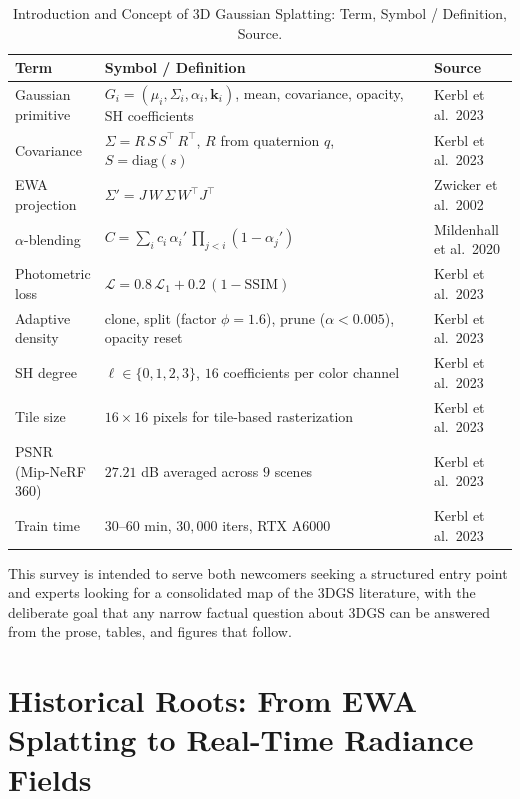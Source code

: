 \documentclass{article}
\begin{document}
\begin{table}[t]
\centering
\caption{Introduction and Concept of 3D Gaussian Splatting: Term, Symbol / Definition, Source.}
\label{tab:introduction-and-concept-of-3d-gaussian-splatting}
\begin{tabular}{>{\raggedright\arraybackslash}p{0.1473\linewidth}
  >{\raggedright\arraybackslash}p{0.6822\linewidth}
  >{\raggedright\arraybackslash}p{0.1705\linewidth}}
\toprule
\textbf{Term} & \textbf{Symbol / Definition} & \textbf{Source} \\
\midrule
Gaussian primitive & \(G_i=(\mu_i,\Sigma_i,\alpha_i,\mathbf{k}_i)\), mean, covariance, opacity, SH coefficients & Kerbl et al.~2023 \\
Covariance & \(\Sigma = R\,S\,S^{\top}\,R^{\top}\), \(R\) from quaternion \(q\), \(S=\mathrm{diag}(s)\) & Kerbl et al.~2023 \\
EWA projection & \(\Sigma' = J\,W\,\Sigma\,W^{\top}J^{\top}\) & Zwicker et al.~2002 \\
\(\alpha\)-blending & \(C=\sum_i c_i\,\alpha_i'\,\prod_{j<i}(1-\alpha_j')\) & Mildenhall et al.~2020 \\
Photometric loss & \(\mathcal{L}=0.8\,\mathcal{L}_1+0.2\,(1-\mathrm{SSIM})\) & Kerbl et al.~2023 \\
Adaptive density & clone, split (factor \(\phi=1.6\)), prune (\(\alpha<0.005\)), opacity reset & Kerbl et al.~2023 \\
SH degree & \(\ell\in\{0,1,2,3\}\), \(16\) coefficients per color channel & Kerbl et al.~2023 \\
Tile size & \(16\times16\) pixels for tile-based rasterization & Kerbl et al.~2023 \\
PSNR (Mip-NeRF 360) & \(27.21\) dB averaged across \(9\) scenes & Kerbl et al.~2023 \\
Train time & \(30\)--\(60\) min, \(30{,}000\) iters, RTX A6000 & Kerbl et al.~2023 \\
\end{tabular}
\end{table}

This survey is intended to serve both newcomers seeking a structured entry point and experts looking for a consolidated map of the 3DGS literature, with the deliberate goal that any narrow factual question about 3DGS can be answered from the prose, tables, and figures that follow.

\section{Historical Roots: From EWA Splatting to Real-Time Radiance Fields}\label{historical-roots-from-ewa-splatting-to-real-time-radiance-fields}
\end{document}
